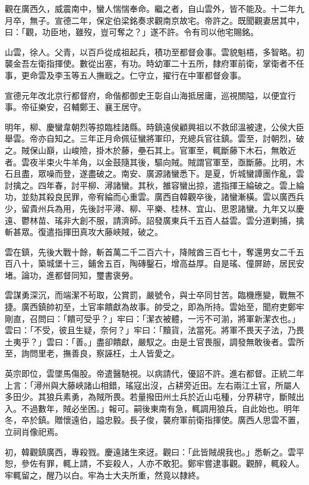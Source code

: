 \begin{pinyinscope}
觀在廣西久，威震南中，蠻人惴惴奉命。繼之者，自山雲外，皆不能及。十二年九月卒，無子。宣德二年，保定伯梁銘奏求觀南京故宅。帝許之。既聞觀妻居其中，曰：「觀，功臣地，雖歿，豈可奪之？」遂不許。令有司以他宅賜銘。

山雲，徐人。父青，以百戶從成祖起兵，積功至都督僉事。雲貌魁梧，多智略。初襲金吾左衛指揮使。數從出塞，有功。時幼軍二十五所，隸府軍前衛，掌衛者不任事，更命雲及李玉等五人撫戢之。仁守立，擢行在中軍都督僉事。

宣德元年改北京行都督府，命偕都御史王彰自山海抵居庸，巡視關隘，以便宜行事。帝征樂安，召輔鄭王、襄王居守。

明年，柳、慶蠻韋朝烈等掠臨桂諸縣。時鎮遠侯顧興祖以不救邱溫被逮，公侯大臣舉雲。帝亦自知之。三年正月命佩征蠻將軍印，充總兵官往鎮。雲至，討朝烈，破之。賊保山巔，山峻險，掛木於藤，壘石其上。官軍至，輒斷藤下木石，無敢近者。雲夜半束火牛羊角，以金鼓隨其後，驅向賊。賊謂官軍至，亟斷藤。比明，木石且盡，眾噪而登，遂盡破之。南安、廣源諸蠻悉下。是夏，忻城蠻譚團作亂，雲討擒之。四年春，討平柳、潯諸蠻。其秋，雒容蠻出掠，遣指揮王綸破之。雲上綸功，並劾其殺良民罪，帝宥綸而心重雲。廣西自韓觀卒後，諸蠻漸橫。雲以廣西兵少，留貴州兵為用，先後討平潯、柳、平樂、桂林、宜山、思恩諸蠻。九年又以慶遠、鬱林苗、瑤非大創不服，請濟師。詔發廣東兵千五百人益雲。雲分道剿捕，擒斬甚眾。復遣指揮田真攻大藤峽賊，破之。

雲在鎮，先後大戰十餘，斬首萬二千二百六十，降賊酋三百七十，奪還男女二千五百八十，築城堡十三，鋪舍五百，陶磚鑿石，增高益厚。自是瑤、僮屏跡，居民安堵。論功，進都督同知，璽書褒勞。

雲謀勇深沉，而端潔不茍取，公賞罰，嚴號令，與士卒同甘苦。臨機應變，戰無不捷。廣西鎮帥初至，土官率饋獻為故事。帥受之，即為所持。雲始至，聞府吏鄭牢剛直，召問曰：「饋可受乎？」牢曰：「潔衣被體，一污不可湔，將軍新潔衣也。」雲曰：「不受，彼且生疑，奈何？」牢曰：「黷貨，法當死。將軍不畏天子法，乃畏土夷乎？」雲曰：「善。」盡卻饋獻，嚴馭之。由是土官畏服，調發無敢後者。雲所至，詢問里老，撫善良，察誣枉，土人皆愛之。

英宗即位，雲墜馬傷股。帝遣醫馳視。以病請代，優詔不許。進右都督。正統二年上言：「潯州與大藤峽諸山相錯，瑤寇出沒，占耕旁近田。左右兩江土官，所屬人多田少。其狼兵素勇，為賊所畏。若量撥田州土兵於近山屯種，分界耕守，斷賊出入。不過數年，賊必坐困。」報可。嗣後東南有急，輒調用狼兵，自此始也。明年冬，卒於鎮。贈懷遠伯，謚忠毅。長子俊，襲府軍前衛指揮使。廣西人思雲不置，立祠肖像祀焉。

初，韓觀鎮廣西，專殺戮。慶遠諸生來迓。觀曰：「此皆賊覘我也。」悉斬之。雲平恕，參佐有罪，輒上請，不妄殺人，人亦不敢犯。鄭牢嘗逮事觀。觀醉，輒殺人。牢輒留之，醒乃以白。牢為士大夫所重，然竟以隸終。


\end{pinyinscope}
